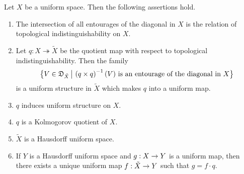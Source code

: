 \documentclass[10pt]{amsart}
\begin{document}
\begin{theorem}\label{theorem:Kolmogorov_quotients_of_uniform_spaces}
	Let $X$ be a uniform space. Then the following assertions hold.
	\begin{enumerate}[label=\emph{\textbf{(\arabic*)}}, leftmargin=3.0em]
		\item The intersection of all entourages of the diagonal in $X$ is the relation of topological indistinguishability on $X$.
		\item Let $q:X\twoheadrightarrow \tilde{X}$ be the quotient map with respect to topological indistinguishability. Then the family
		      $$\big\{V \in {\mathfrak D}_{\tilde{X}}\,\big|\,\left(q\times q\right)^{-1}(V)\mbox{ is an entourage of the diagonal in }X\big\}$$
		      is a uniform structure in $\tilde{X}$ which makes $q$ into a uniform map.
		\item $q$ induces uniform structure on $X$.
		\item $q$ is a Kolmogorov quotient of $X$.
		\item $\tilde{X}$ is a Hausdorff uniform space.
		\item If $Y$ is a Hausdorff uniform space and $g:X\rightarrow Y$ is a uniform map, then there exists a unique uniform map $f:\tilde{X} \rightarrow Y$ such that $g = f \cdot q$.
	\end{enumerate}
\end{theorem}
\end{document}
